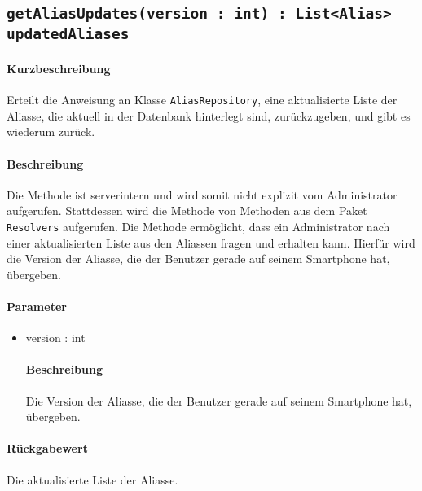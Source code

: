 \subsection{\texttt{getAliasUpdates(version : int) : List<Alias> updatedAliases}}%
\paragraph*{Kurzbeschreibung}
Erteilt die Anweisung an Klasse \texttt{AliasRepository}, eine aktualisierte Liste der Aliasse, die aktuell in der Datenbank hinterlegt sind, zurückzugeben, und gibt es wiederum zurück.
\paragraph*{Beschreibung}
Die Methode ist serverintern und wird somit nicht explizit vom Administrator aufgerufen.
Stattdessen wird die Methode von Methoden aus dem Paket \texttt{Resolvers} aufgerufen.
Die Methode ermöglicht, dass ein Administrator nach einer aktualisierten Liste aus den Aliassen fragen und erhalten kann.
Hierfür wird die Version der Aliasse, die der Benutzer gerade auf seinem Smartphone hat, übergeben.
\paragraph*{Parameter}
\begin{itemize}
    \item version : int
    		\paragraph*{Beschreibung}
    		Die Version der Aliasse, die der Benutzer gerade auf seinem Smartphone hat, übergeben.
\end{itemize}
\paragraph*{Rückgabewert}
Die aktualisierte Liste der Aliasse.
